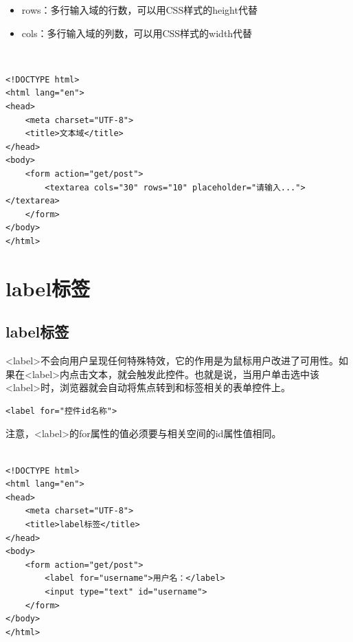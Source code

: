 \begin{itemize}
	\item rows：多行输入域的行数，可以用CSS样式的height代替
	\item cols：多行输入域的列数，可以用CSS样式的width代替
\end{itemize}

\vspace{0.5cm}

\\

\begin{lstlisting}[style=htmlcssjs]
<!DOCTYPE html>
<html lang="en">
<head>
    <meta charset="UTF-8">
    <title>文本域</title>
</head>
<body>
    <form action="get/post">
        <textarea cols="30" rows="10" placeholder="请输入..."></textarea>
    </form>
</body>
</html>
\end{lstlisting}

\newpage

\section{label标签}

\subsection{label标签}

<label>不会向用户呈现任何特殊特效，它的作用是为鼠标用户改进了可用性。如果在<label>内点击文本，就会触发此控件。也就是说，当用户单击选中该<label>时，浏览器就会自动将焦点转到和标签相关的表单控件上。\\

\begin{lstlisting}[style=htmlcssjs]
<label for="控件id名称">
\end{lstlisting}

注意，<label>的for属性的值必须要与相关空间的id属性值相同。\\

\\

\begin{lstlisting}[style=htmlcssjs]
<!DOCTYPE html>
<html lang="en">
<head>
    <meta charset="UTF-8">
    <title>label标签</title>
</head>
<body>
    <form action="get/post">
        <label for="username">用户名：</label>
        <input type="text" id="username">
    </form>
</body>
</html>
\end{lstlisting}

\newpage

